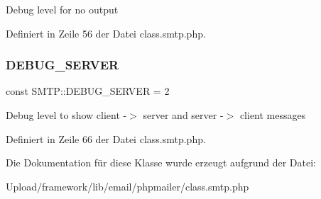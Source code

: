 Debug level for no output 

Definiert in Zeile 56 der Datei class.\+smtp.\+php.

\mbox{\label{class_s_m_t_p_a95ba76d2b5ef58318d4ac64eb0d2e981}} 
\subsubsection{\texorpdfstring{D\+E\+B\+U\+G\+\_\+\+S\+E\+R\+V\+ER}{DEBUG\_SERVER}}
{\footnotesize\ttfamily const S\+M\+T\+P\+::\+D\+E\+B\+U\+G\+\_\+\+S\+E\+R\+V\+ER = 2}

Debug level to show client -\/$>$ server and server -\/$>$ client messages 

Definiert in Zeile 66 der Datei class.\+smtp.\+php.



Die Dokumentation für diese Klasse wurde erzeugt aufgrund der Datei\+:\begin{DoxyCompactItemize}
\item 
Upload/framework/lib/email/phpmailer/class.\+smtp.\+php\end{DoxyCompactItemize}
